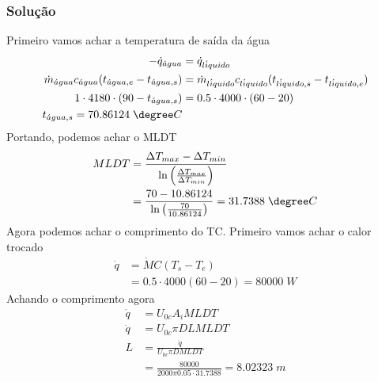 \subsubsection{Solução}
Primeiro vamos achar a temperatura de saída da água
\begin{align}
    -\dot{q}_{\acute{a}gua} &= \dot{q}_{l\acute{i}quido}\\
    \dot{m}_{\acute{a}gua} c_{\acute{a}gua} (t_{\acute{a}gua,e} - t_{\acute{a}gua,s} ) &= \dot{m}_{l\acute{i}quido} c_{l\acute{i}quido} (t_{l\acute{i}quido,s} - t_{l\acute{i}quido,e} )\\
    1 \cdot 4180 \cdot (90 - t_{\acute{a}gua,s} ) &= 0.5 \cdot 4000 \cdot (60 - 20) \\
    t_{\acute{a}gua, s}= 70.86124 \; \degree C
\end{align} 
Portando, podemos achar o MLDT
\begin{align}
    MLDT &= \frac{\Delta T_{max} - \Delta T_{min}}{\ln \left( \frac{\Delta T_{max}}{\Delta T_{min}} \right)} \\
    &= \frac{70 - 10.86124}{\ln \left( \frac{70}{10.86124} \right)} = 31.7388 \; \degree C
\end{align}
Agora podemos achar o comprimento do TC. Primeiro vamos achar o calor trocado
\begin{align}
    \dot{q} &= \dot{M} C (T_{s} - T_{e} )\\
    &= 0.5 \cdot 4000 (60 - 20) = 80000 \; W
\end{align}
Achando o comprimento agora
\begin{align}
    \dot{q} &= U_{0c} A_{i} MLDT\\
    \dot{q} &= U_{0c} \pi D L MLDT\\
    L &= \frac{\dot{q}}{U_{0c} \pi D MLDT}\\
    &= \frac{80000}{2000 \pi 0.05 \cdot 31.7388} = 8.02323 \; m
\end{align}
